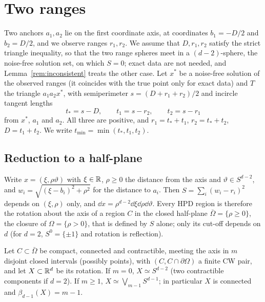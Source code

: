 \section{Two ranges}\label{sec:two}

Two anchors $a_1, a_2$ lie on the first coordinate axis, at coordinates $b_1 = -D/2$ and $b_2 = D/2$, and we observe
ranges $r_1, r_2$. We
assume that $D, r_1, r_2$ satisfy the strict triangle inequality, so that the two range spheres meet in a
$(d-2)$-sphere, the noise-free solution set, on which $S = 0$; exact data are not needed, and Lemma~\ref{rem:inconsistent} treats the other case.
Let $x^*$ be a noise-free solution of the observed ranges (it coincides with the true point only for exact data) and
$T$ the triangle $a_1 a_2 x^*$, with semiperimeter $s = (D + r_1 + r_2)/2$ and
incircle tangent lengths \citep{coxeter1969}
\[ t_* = s - D, \qquad t_1 = s - r_2, \qquad t_2 = s - r_1 \]
from $x^*$, $a_1$ and $a_2$. All three are positive, and $r_1 = t_* + t_1$, $r_2 = t_* + t_2$, $D = t_1 + t_2$. We write
$t_{\min} = \min(t_*, t_1, t_2)$.

\subsection{Reduction to a half-plane}

Write $x = (\xi, \rho\vartheta)$ with $\xi \in \mathbb{R}$, $\rho \ge 0$ the distance from the axis and $\vartheta \in S^{d-2}$, and
$w_i = \sqrt{(\xi - b_i)^2 + \rho^2}$ for the distance to $a_i$. Then $S = \sum_i (w_i - r_i)^2$ depends on $(\xi,\rho)$
only, and $\dd x = \rho^{d-2}\dd\xi\dd\rho\dd\vartheta$. Every HPD region is therefore the rotation about the axis of a region
$C$ in the closed half-plane $\bar\Omega = \{\rho \ge 0\}$, the closure of $\Omega = \{\rho > 0\}$, that is defined by $S$ alone; only its cut-off depends on $d$
(for $d = 2$, $S^0 = \{\pm1\}$ and rotation is reflection).

\begin{lemma}[Lift]\label{lem:lift}
Let $C \subset \bar\Omega$ be compact, connected and contractible, meeting the axis in $m$ disjoint closed intervals
(possibly points), with $(C, C \cap \partial\Omega)$ a finite CW pair, and let $X \subset \mathbb{R}^d$ be its rotation. If $m = 0$,
$X \simeq S^{d-2}$ (two contractible components if $d = 2$). If $m \ge 1$, $X \simeq \bigvee_{m-1} S^{d-1}$; in
particular $X$ is connected and $\beta_{d-1}(X) = m - 1$.
\end{lemma}

